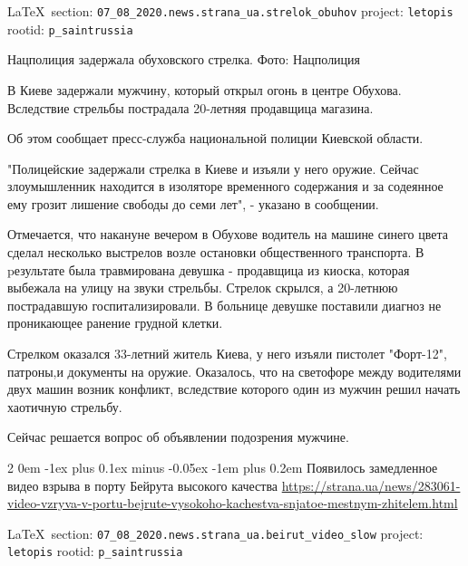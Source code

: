 \documentclass[a4paper,11pt]{extreport}
\makeatletter
\renewcommand\subsection{%
  \clearpage
    \@startsection{subsection}%
    {2}%
    {0em}%
    {-1ex plus 0.1ex minus -0.05ex}%
    {-1em plus 0.2em}%
    {\scshape\bfseries\Large}%
}
\makeatother
\begin{document}
\vspace{0.5cm}
 {\ifDEBUG\small\LaTeX~section: \verb|07_08_2020.news.strana_ua.strelok_obuhov| project: \verb|letopis| rootid: \verb|p_saintrussia| \fi}
\vspace{0.5cm}

Нацполиция задержала обуховского стрелка. Фото: Нацполиция

В Киеве задержали мужчину, который открыл огонь в центре Обухова. Вследствие
стрельбы пострадала 20-летняя продавщица магазина. 

Об этом сообщает пресс-служба национальной полиции Киевской области.

"Полицейские задержали стрелка в Киеве и изъяли у него оружие. Сейчас
злоумышленник находится в изоляторе временного содержания и за содеянное ему
грозит лишение свободы до семи лет", - указано в сообщении. 

Отмечается, что накануне вечером в Обухове водитель на машине синего цвета
сделал несколько выстрелов возле остановки общественного транспорта. В
pезультате была травмирована девушка - продавщица из киоска, которая выбежала
на улицу на звуки стрельбы. Стрелок скрылся, а 20-летнюю пострадавшую
госпитализировали. В больнице девушке поставили диагноз не проникающее ранение
грудной клетки.

Стрелком оказался 33-летний житель Киева, у него изъяли пистолет "Форт-12",
патроны,и документы на оружие. Оказалось, что на светофоре между водителями
двух машин возник конфликт, вследствие которого один из мужчин решил начать
хаотичную стрельбу. 

Сейчас решается вопрос об объявлении подозрения мужчине. 
 
 
\subsection{Появилось замедленное видео взрыва в порту Бейрута высокого качества}
\label{sec:07_08_2020.news.strana_ua.beirut_video_slow}
\url{https://strana.ua/news/283061-video-vzryva-v-portu-bejrute-vysokoho-kachestva-snjatoe-mestnym-zhitelem.html}

  
\vspace{0.5cm}
 {\ifDEBUG\small\LaTeX~section: \verb|07_08_2020.news.strana_ua.beirut_video_slow| project: \verb|letopis| rootid: \verb|p_saintrussia| \fi}
\vspace{0.5cm}
\end{document}
